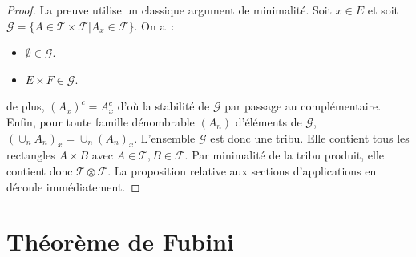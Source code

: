 \begin{proof}
La preuve utilise un classique argument de minimalité. Soit $x  \in E$
et soit $\mathcal{G} = \{ A \in \mathcal{T} \times \mathcal{F} | A_x
\in \mathcal{F} \}$. On a~:
\begin{itemize}
\item $\emptyset \in \mathcal{G}$.
\item $E \times F \in \mathcal {G}$.
\end{itemize}
de plus, $(A_x)^c = A^c_x$ d'où la stabilité de $\mathcal{G}$ par
passage au complémentaire. Enfin, pour toute famille dénombrable
$(A_n)$ d'éléments de $\mathcal{G}$, $(\cup_n A_n)_x = \cup_n
(A_n)_x$. L'ensemble $\mathcal{G}$ est donc une tribu. Elle contient
tous les rectangles $A \times B$ avec $A\in \mathcal{T}, B \in
\mathcal{F}$. Par minimalité de la tribu produit, elle contient donc
$\mathcal{T} \otimes \mathcal{F}$. 
La proposition relative aux sections d'applications en découle immédiatement.
\end{proof}
\section{Théorème de Fubini}


